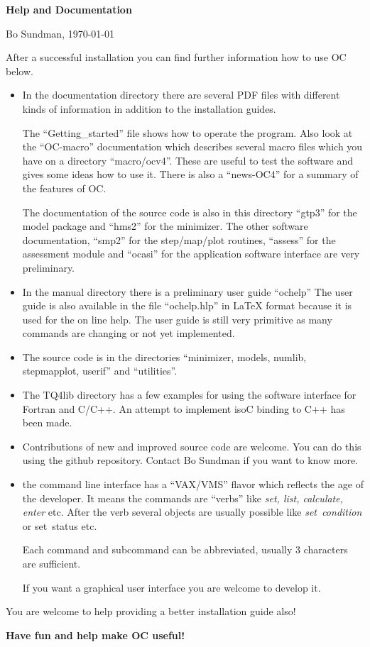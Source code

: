 \documentclass[12pt]{article}
\begin{document}
\begin{center}
{\Large \bf Help and Documentation}

Bo Sundman, \today

\end{center}

After a successful installation you can find further information how
to use OC below.
\begin{itemize}
\item In the documentation directory there are several PDF files with
  different kinds of information in addition to the installation
  guides.

  The ``Getting\_started'' file shows how to operate the program.
  Also look at the ``OC-macro'' documentation which describes several
  macro files which you have on a directory ``macro/ocv4''.  These are
  useful to test the software and gives some ideas how to use it.
  There is also a ``news-OC4'' for a summary of the features of OC.

  The documentation of the source code is also in this directory
  ``gtp3'' for the model package and ``hms2'' for the minimizer.  The
  other software documentation, ``smp2'' for the step/map/plot
  routines, ``assess'' for the assessment module and ``ocasi'' for the
  application software interface are very preliminary.

\item In the manual directory there is a preliminary user guide
  ``ochelp'' The user guide is also available in the file
  ``ochelp.hlp'' in LaTeX format because it is used for the on line
  help.  The user guide is still very primitive as many commands are
  changing or not yet implemented.

\item The source code is in the directories ``minimizer, models,
  numlib, stepmapplot, userif'' and ``utilities''.

\item The TQ4lib directory has a few examples for using the software
  interface for Fortran and C/C++.  An attempt to implement isoC
  binding to C++ has been made.

\item Contributions of new and improved source code are welcome.  You
  can do this using the github repository.  Contact Bo Sundman if you
  want to know more.

\item the command line interface has a ``VAX/VMS'' flavor which
  reflects the age of the developer.  It means the commands are
  ``verbs'' like {\em set, list, calculate, enter} etc.  After the
  verb several objects are usually possible like {\em set~condition}
  or {set~status} etc.

  Each command and subcommand can be abbreviated, usually 3 characters
  are sufficient.

  If you want a graphical user interface you are welcome to develop
  it.
\end{itemize}

You are welcome to help providing a better installation guide also!

\bigskip

{\large \bf Have fun and help make OC useful!}
\end{document}
